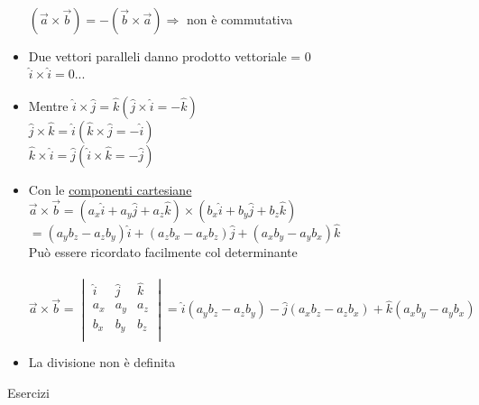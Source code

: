\documentclass{report}
\begin{document}
\begin{itemize}
\begin{figure}[!ht]
        \end{figure}
        \\$(\vec{a}\times\vec{b})=-(\vec{b}\times\vec{a}) \Rightarrow $ non è commutativa
  \item Due vettori paralleli danno prodotto vettoriale = 0\\$\hat{i}\times\hat{i}=0 ...$
  \item Mentre $\hat{i}\times\hat{j}=\hat{k} (\hat{j}\times\hat{i}=-\hat{k})$\\$\hat{j}\times\hat{k}=\hat{i} (\hat{k}\times\hat{j}=-\hat{i})$\\$\hat{k}\times\hat{i}=\hat{j} (\hat{i}\times\hat{k}=-\hat{j})$
  \item Con le \underline{componenti cartesiane}\\
        $\vec{a}\times\vec{b}=(a_x\hat{i}+a_y\hat{j}+a_z\hat{k})\times(b_x\hat{i}+b_y\hat{j}+b_z\hat{k})$\\$=(a_yb_z-a_zb_y)\hat{i}+(a_zb_x-a_xb_z)\hat{j}+(a_xb_y-a_yb_x)\hat{k}$\\
          Può essere ricordato facilmente col determinante\\\\
        $\vec{a}\times\vec{b}=\begin{vmatrix}
          \hat{i} & \hat{j} & \hat{k} \\
          a_x     & a_y     & a_z     \\
          b_x     & b_y     & b_z     \\
        \end{vmatrix}=\hat{i}(a_yb_z-a_zb_y)-\hat{j}(a_xb_z-a_zb_x)+\hat{k}(a_xb_y-a_yb_x)$
  \item La divisione non è definita
\end{itemize}
Esercizi
\end{document}
